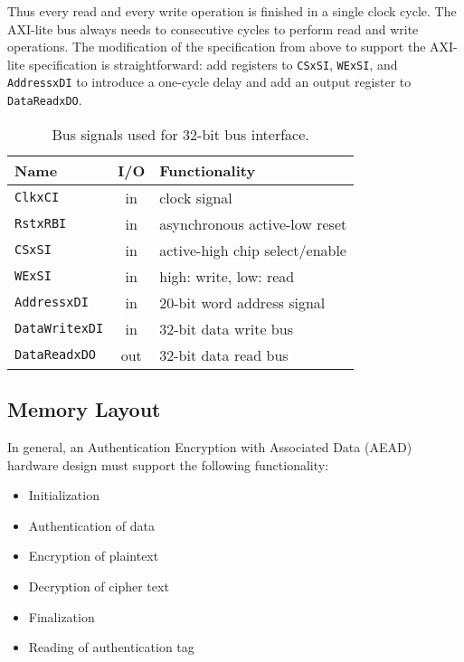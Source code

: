 \documentclass[runningheads]{llncs}
\begin{document}
Thus every read and every write operation is finished in a single clock cycle. The AXI-lite bus always needs to consecutive cycles to perform read and write operations. The modification of the specification from above to support the AXI-lite specification is straightforward: add registers to \texttt{CSxSI}, \texttt{WExSI}, and \texttt{AddressxDI} to introduce a one-cycle delay and add an output register to \texttt{DataReadxDO}.

\begin{table}[htb]
\caption{Bus signals used for 32-bit bus interface.}
\label{tbl:bus-signals}
\centering
\begin{tabular}{|l|c|l|} \hline
Name & I/O & Functionality \\ \hline
\texttt{ClkxCI}  & in & clock signal \\
\texttt{RstxRBI} & in & asynchronous active-low reset \\
\texttt{CSxSI}   & in & active-high chip select/enable \\
\texttt{WExSI}   & in & high: write, low: read \\
\texttt{AddressxDI}   & in & 20-bit word address signal \\
\texttt{DataWritexDI} & in & 32-bit data write bus \\
\texttt{DataReadxDO}  & out & 32-bit data read bus \\ \hline
\end{tabular}
\end{table}%

\subsection{Memory Layout}

In general, an Authentication Encryption with Associated Data (AEAD) hardware design must support the following functionality: 

\begin{itemize}
\item Initialization
\item Authentication of data
\item Encryption of plaintext
\item Decryption of cipher text
\item Finalization
\item Reading of authentication tag
\end{itemize}

\newcommand{\specialcell}[2][c]{%
  \begin{tabular}[#1]{@{}l@{}}#2\end{tabular}}
\end{document}
